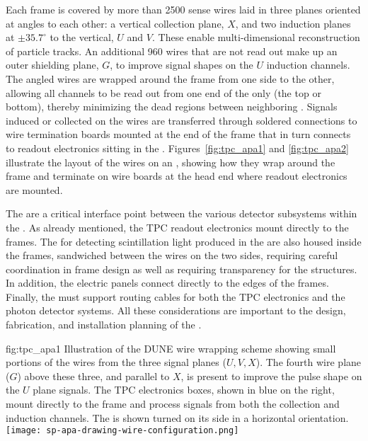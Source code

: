 Each  frame is covered by more than \num{2500} sense wires laid in three planes  oriented at angles to each other: a vertical collection plane, $X$, and two induction planes at $\pm35.7^\circ$ to the vertical, $U$ and $V$. These enable multi-dimensional reconstruction of particle tracks.  An additional \num{960} wires that are not read out make up an outer shielding plane, $G$, to improve signal shapes on the $U$ induction channels.  The angled wires are wrapped around the frame from one side to the other, allowing all channels to be read out from one end of the  only (the top or bottom), thereby minimizing the dead regions between neighboring . Signals induced or collected on the wires are transferred through soldered connections to wire termination boards mounted at the end of the  frame that in turn connects to  readout electronics sitting in the \lar.  Figures~\ref{fig:tpc_apa1} and \ref{fig:tpc_apa2} illustrate the layout of the wires on an , showing how they wrap around the frame and terminate on wire boards at the head end where readout electronics are mounted.

The  are a critical interface point between the various detector subsystems within the .  As already mentioned, the TPC readout electronics mount directly to the  frames.  The  for detecting scintillation light produced in the \lar are also housed inside the frames, sandwiched between the wires on the two sides, requiring careful coordination in frame design as well as requiring transparency for the  structures.  In addition, the electric  panels connect directly to the edges of the  frames.  Finally, the  must support routing cables for both the TPC electronics and the photon detector systems. All these considerations are important to the design, fabrication, and installation planning of the .

\begin{dunefigure}{fig:tpc_apa1}
{Illustration of the DUNE  wire wrapping scheme showing small portions of the wires from the three signal planes ($U,V,X$). The fourth wire plane ($G$) above these three, and parallel to $X$, is present to improve the pulse shape on the $U$ plane signals. The TPC electronics boxes, shown in blue on the right, mount directly to the frame and process signals from both the collection and induction channels. The  is shown turned on its side in a horizontal orientation.} 
\texttt{[image: sp-apa-drawing-wire-configuration.png]} 
\end{dunefigure} 

